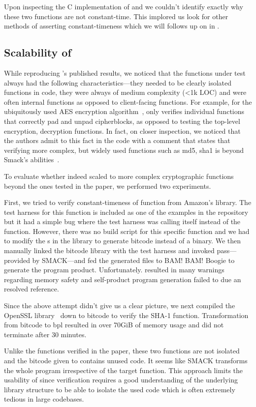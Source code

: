 Upon inspecting the C implementation of  and 
we couldn't identify exactly why these two functions are not constant-time.
This implored us look for other methods of asserting constant-timeness which
we will follows up on in .



\subsection{Scalability of \ctVerif}

While reproducing \ctVerif's published results, we noticed that the functions under test always had the following characteristics---they needed to be clearly isolated functions in code, they were always of medium complexity (<1k LOC) and were often internal functions as opposed to client-facing functions. 
For example, for the ubiquitously used AES encryption algorithm~\cite{aes}, \ctVerif only verifies individual functions that correctly pad and unpad cipherblocks, as opposed to testing the top-level encryption, decryption functions.
In fact, on closer inspection, we noticed that the authors admit to this fact in the code with a comment that states that verifying more complex, but widely used functions such as md5, sha1 is beyond Smack's abilities~\cite{scalability-comment}.

 
To evaluate whether \ctVerif indeed scaled to more complex cryptographic functions beyond the ones tested in the paper, we performed two experiments.

First, we tried to verify
constant-timeness of function  from Amazon's
 library. The test harness for this function is included as one of the
examples in the \ctVerif repository but it had a simple bug where the test
harness was calling itself instead of the  function.
However, there was no build script for this specific function and we had to modify the
s in the  library to generate
 bitcode instead of a binary. We then manually linked the bitcode
library with the test harness and invoked  pass---provided by
SMACK---and fed the generated  files to BAM! BAM! Boogie to
generate the program product. Unfortunately.  resulted in
many warnings regarding memory safety and self-product program generation failed
to due an resolved reference.

Since the above attempt didn't give us a clear picture, we next compiled the OpenSSL library~\cite{openssl} down to 
bitcode to verify the SHA-1 function. Transformation from bitcode to bpl
resulted in over 70GiB of memory usage and did not terminate after 30 minutes.

Unlike the functions verified in the paper, these two functions are not
isolated and the bitcode given to \ctVerif contains unused code. It seems like
SMACK transforms the whole program irrespective of the target function. This
approach limits the usability of \ctVerif since verification requires a good
understanding of the underlying library structure to be able to isolate the used
code which is often extremely tedious in large codebases.